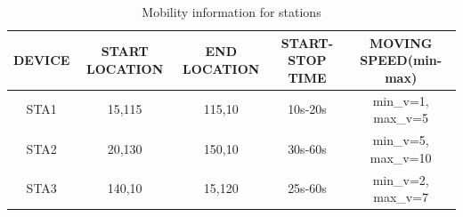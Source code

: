 \documentclass{article}
\begin{document}
    	\begin{table}[h]
		\small
		\centering
       		\begin{tabular}{|c|c|c|c|c|}
        			\hline
        			DEVICE & START LOCATION & END LOCATION & START-STOP TIME & MOVING SPEED(min-max)  \\
        			\hline
        			STA1 & 15,115 & 115,10 & 10s-20s & min\_v=1, max\_v=5 \\
        			STA2 & 20,130 & 150,10 & 30s-60s & min\_v=5, max\_v=10 \\
        			STA3 & 140,10 & 15,120 & 25s-60s & min\_v=2, max\_v=7 \\
        			\hline
        		\end{tabular}
        \caption{Mobility information for stations}
        \label{tab:2}
    	\end{table}
\end{document}
